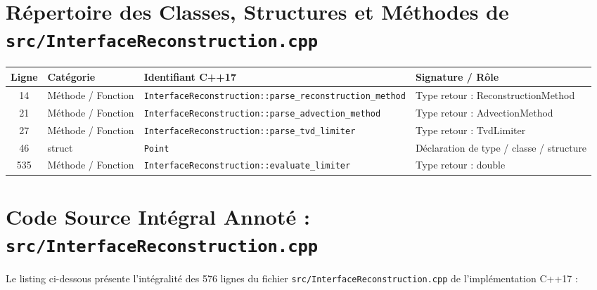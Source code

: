 \documentclass[10pt,a4paper,oneside]{book}
\begin{document}
\section{Répertoire des Classes, Structures et Méthodes de \texttt{src/InterfaceReconstruction.cpp}}
\begin{center}\small
\begin{tabular}{clll}
\toprule
\textbf{Ligne} & \textbf{Catégorie} & \textbf{Identifiant C++17} & \textbf{Signature / Rôle} \\
\midrule
14 & Méthode / Fonction & \texttt{InterfaceReconstruction::parse\_reconstruction\_method} & Type retour : ReconstructionMethod \\
21 & Méthode / Fonction & \texttt{InterfaceReconstruction::parse\_advection\_method} & Type retour : AdvectionMethod \\
27 & Méthode / Fonction & \texttt{InterfaceReconstruction::parse\_tvd\_limiter} & Type retour : TvdLimiter \\
46 & struct & \texttt{Point} & Déclaration de type / classe / structure \\
535 & Méthode / Fonction & \texttt{InterfaceReconstruction::evaluate\_limiter} & Type retour : double \\
\bottomrule
\end{tabular}
\end{center}

\section{Code Source Intégral Annoté : \texttt{src/InterfaceReconstruction.cpp}}
Le listing ci-dessous présente l'intégralité des 576 lignes du fichier \texttt{src/InterfaceReconstruction.cpp} de l'implémentation C++17 :
\end{document}
